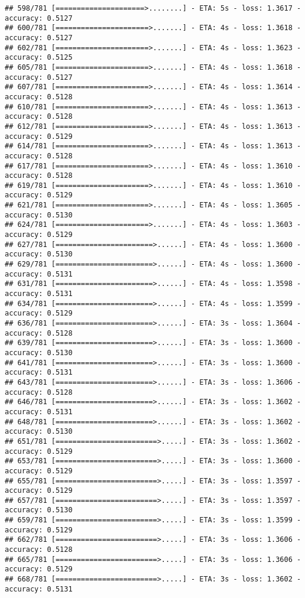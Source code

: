 \documentclass[
]{article}
\begin{document}
\begin{verbatim}
## 598/781 [=====================>........] - ETA: 5s - loss: 1.3617 - accuracy: 0.5127
## 600/781 [======================>.......] - ETA: 4s - loss: 1.3618 - accuracy: 0.5127
## 602/781 [======================>.......] - ETA: 4s - loss: 1.3623 - accuracy: 0.5125
## 605/781 [======================>.......] - ETA: 4s - loss: 1.3618 - accuracy: 0.5127
## 607/781 [======================>.......] - ETA: 4s - loss: 1.3614 - accuracy: 0.5128
## 610/781 [======================>.......] - ETA: 4s - loss: 1.3613 - accuracy: 0.5128
## 612/781 [======================>.......] - ETA: 4s - loss: 1.3613 - accuracy: 0.5129
## 614/781 [======================>.......] - ETA: 4s - loss: 1.3613 - accuracy: 0.5128
## 617/781 [======================>.......] - ETA: 4s - loss: 1.3610 - accuracy: 0.5128
## 619/781 [======================>.......] - ETA: 4s - loss: 1.3610 - accuracy: 0.5129
## 621/781 [======================>.......] - ETA: 4s - loss: 1.3605 - accuracy: 0.5130
## 624/781 [======================>.......] - ETA: 4s - loss: 1.3603 - accuracy: 0.5129
## 627/781 [=======================>......] - ETA: 4s - loss: 1.3600 - accuracy: 0.5130
## 629/781 [=======================>......] - ETA: 4s - loss: 1.3600 - accuracy: 0.5131
## 631/781 [=======================>......] - ETA: 4s - loss: 1.3598 - accuracy: 0.5131
## 634/781 [=======================>......] - ETA: 4s - loss: 1.3599 - accuracy: 0.5129
## 636/781 [=======================>......] - ETA: 3s - loss: 1.3604 - accuracy: 0.5128
## 639/781 [=======================>......] - ETA: 3s - loss: 1.3600 - accuracy: 0.5130
## 641/781 [=======================>......] - ETA: 3s - loss: 1.3600 - accuracy: 0.5131
## 643/781 [=======================>......] - ETA: 3s - loss: 1.3606 - accuracy: 0.5128
## 646/781 [=======================>......] - ETA: 3s - loss: 1.3602 - accuracy: 0.5131
## 648/781 [=======================>......] - ETA: 3s - loss: 1.3602 - accuracy: 0.5130
## 651/781 [========================>.....] - ETA: 3s - loss: 1.3602 - accuracy: 0.5129
## 653/781 [========================>.....] - ETA: 3s - loss: 1.3600 - accuracy: 0.5129
## 655/781 [========================>.....] - ETA: 3s - loss: 1.3597 - accuracy: 0.5129
## 657/781 [========================>.....] - ETA: 3s - loss: 1.3597 - accuracy: 0.5130
## 659/781 [========================>.....] - ETA: 3s - loss: 1.3599 - accuracy: 0.5129
## 662/781 [========================>.....] - ETA: 3s - loss: 1.3606 - accuracy: 0.5128
## 665/781 [========================>.....] - ETA: 3s - loss: 1.3606 - accuracy: 0.5129
## 668/781 [========================>.....] - ETA: 3s - loss: 1.3602 - accuracy: 0.5131

\end{verbatim}
\end{document}
